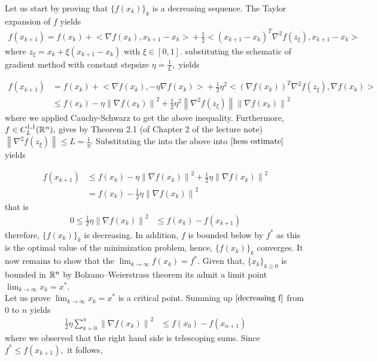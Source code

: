 \documentclass{ExerciseSheet}
\begin{document}
\begin{solution}
Let us start by proving that $\{f(x_k)\}_k$ is a decreasing sequence. The Taylor expansion of $f$ yields
\begin{align*}
    f(x_{k+1}) = f(x_k)+ \big< \nabla f(x_k), x_{k+1}-x_k \big> +\frac{1}{2} \big<(x_{k+1}-x_k)^T \nabla^2 f(z_{\xi}), x_{k+1}-x_k \big>
\end{align*}
where $z_{\xi}=x_k + \xi(x_{k+1}-x_k)$ with $\xi\in [0, 1].$
substituting the schematic of gradient method with constant  stepsize $\eta=\frac{1}{L},$ yields

  \begin{align}
    f(x_{k+1}) &= f(x_k)+ \big< \nabla f(x_k), -\eta\nabla f(x_k) \big> +\frac{1}{2}\eta^2 \big<(\nabla f(x_k))^T \nabla^2 f(z_{\xi}), \nabla f(x_k) \big>\nonumber\\
    &\leq f(x_k) -\eta\left\|\nabla f(x_k)\right\|^2 +\frac{1}{2}\eta^2\left\|\nabla^2 f(z_{\xi})\right\|\left\|\nabla f(x_k)\right\|^2 \label{hess estimate}
 \end{align}
where we applied Cauchy-Schwarz to get the above inequality. Furthermore, $f \in C^{1,1}_L(\mathbb{R}^n),$ gives by Theorem 2.1 (of Chapter 2 of the lecture note) $\left\|\nabla^2 f(z_{\xi})\right\|\leq L=\frac{1}{\eta}.$ Substituting the into the above into $\eqref{hess estimate}$ yields

  \begin{align*}
    f(x_{k+1})&\leq f(x_k) -\eta\left\|\nabla f(x_k)\right\|^2 +\frac{1}{2}\eta\left\|\nabla f(x_k)\right\|^2\\
    &=f(x_k) -\frac{1}{2}\eta\left\|\nabla f(x_k)\right\|^2
 \end{align*}
that is
 \begin{align}
   0\leq \frac{1}{2}\eta\left\|\nabla f(x_k)\right\|^2&\leq f(x_k) - f(x_{k+1}) \label{decreasing f}
 \end{align}
therefore,  $\{f(x_k)\}_k$ is decreasing. In addition, $f$ is bounded below by $f^*$ as this is the optimal value of the minimization problem, hence, $\{f(x_k)\}_k$ converges. It now remains to show that the $\displaystyle \lim_{k\to\infty}f(x_k)=f^*.$ Given that,  $\{ x_k\}_{k \geq0}$ is bounded in $\mathbb{R}^n$ by Bolzano–Weierstrass theorem its admit a limit point $\displaystyle\lim_{k\to\infty}x_k=x^*$.\\
Let us prove $\displaystyle\lim_{k\to\infty}x_k=x^*$ is a critical point.
 Summing up $\eqref{decreasing f}$ from $0$ to $n$ yields
  \begin{align*}
      \frac{1}{2}\eta\sum_{k=0}^{n}\left\|\nabla f(x_k)\right\|^2&\leq f(x_0) - f(x_{n+1})
  \end{align*}
  where we observed that the right hand side is telescoping sums. Since $f^*\leq f(x_{k+1}),$ it follows,


\end{solution}
\end{document}
